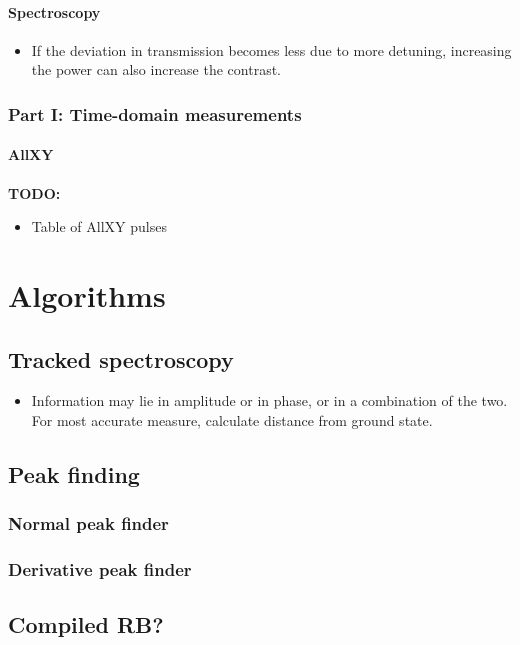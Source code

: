     \subsubsection{Spectroscopy}
      \begin{itemize}
        \item If the deviation in transmission becomes less due to more detuning, increasing the power can also increase the contrast.
      \end{itemize}
  \subsection{Part I: Time-domain measurements}
    \subsubsection{AllXY}
      \label{ssec:AllXY}
      \textbf{TODO:}
      \begin{itemize}
        \item Table of AllXY pulses
      \end{itemize}
\chapter{Algorithms}
\section{Tracked spectroscopy}
\label{sec:Tracked spectroscopy}
  \begin{itemize}
    \item Information may lie in amplitude or in phase, or in a combination of the two. For most accurate measure, calculate distance from ground state.
  \end{itemize}
\section{Peak finding}
  \subsection{Normal peak finder}
  \subsection{Derivative peak finder}
\section{Compiled RB?}